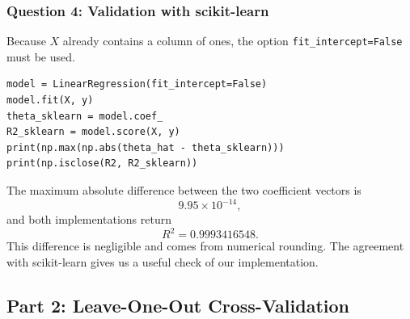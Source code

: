 \documentclass[11pt,a4paper]{article}
\begin{document}
\subsubsection{Question 4: Validation with scikit-learn}
Because $X$ already contains a column of ones, the option
\texttt{fit\_intercept=False} must be used.
\begin{lstlisting}[caption={Comparison with scikit-learn.}]
model = LinearRegression(fit_intercept=False)
model.fit(X, y)
theta_sklearn = model.coef_
R2_sklearn = model.score(X, y)
print(np.max(np.abs(theta_hat - theta_sklearn)))
print(np.isclose(R2, R2_sklearn))
\end{lstlisting}
\begin{resultbox}
The maximum absolute difference between the two coefficient vectors is
\[
    9.95\times10^{-14},
\]
and both implementations return
\[
    R^2=0.9993416548.
\]
This difference is negligible and comes from numerical rounding. The agreement
with scikit-learn gives us a useful check of our implementation.
\end{resultbox}
\subsection{Part 2: Leave-One-Out Cross-Validation}
\end{document}
